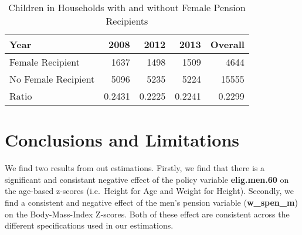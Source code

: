 \begin{refsection}
\begin{table}[ht!]
\centering
\caption{Children in Households with and without Female Pension Recipients}
\label{sa:ta:hfr}
    \begin{tabular}{l|rrrr}
    \hline
    Year                & 2008   & 2012   & 2013   & Overall \\
    \hline
    Female Recipient    & 1637   & 1498   & 1509   & 4644    \\
    No Female Recipient & 5096   & 5235   & 5224   & 15555   \\
    Ratio               & 0.2431 & 0.2225 & 0.2241 & 0.2299  \\
    \end{tabular}
\end{table}


\section{Conclusions and Limitations}
We find two results from out estimations.
Firstly, we find that there is a significant and consistant negative effect of the policy variable \textbf{elig.men.60} on the age-based z-scores
(i.e.~Height for Age and Weight for Height).
Secondly, we find a consistent and negative effect of the men's pension variable (\textbf{w\_spen\_m}) on the Body-Mass-Index Z-scores.
Both of these effect are consistent across the different specifications used in our estimations.







\printbibliography
\end{refsection}